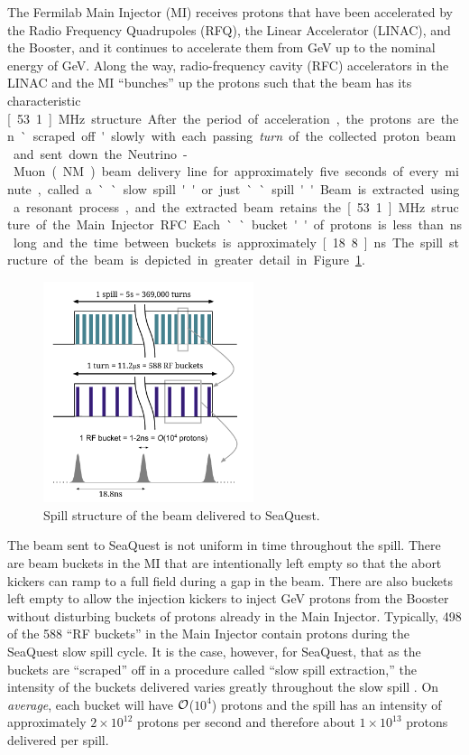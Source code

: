 The Fermilab Main Injector (MI) receives protons that have been accelerated by the Radio Frequency Quadrupoles (RFQ), the Linear Accelerator (LINAC), and the Booster, and it continues to accelerate them from \unit[8]{GeV} up to the nominal energy of \unit[120]{GeV}. Along the way, radio-frequency cavity (RFC) accelerators in the LINAC and the MI ``bunches'' up the protons such that the beam has its characteristic \unit[53.1]{MHz} structure. After the period of acceleration, the protons are then `scraped off' slowly with each passing \emph{turn} of the collected proton beam and sent down the Neutrino-Muon (NM) beam delivery line for approximately five seconds of every minute, called a ``slow spill'' or just ``spill''. Beam is extracted using a resonant process, and the extracted beam retains the \unit[53.1]{MHz} structure of the Main Injector RFC. Each ``bucket'' of protons is less than \unit[2]{ns} long and the time between buckets is approximately \unit[18.8]{ns}. The spill structure of the beam is depicted in greater detail in Figure \ref{fig:SpillStructure}.

\begin{figure}
	\begin{center}
		\includegraphics[width=0.55\textwidth]{figures/apparatus/SpillStructure.pdf}
		\caption{Spill structure of the beam delivered to SeaQuest.}
		\label{fig:SpillStructure}
	\end{center}
\end{figure}

The beam sent to SeaQuest is not uniform in time throughout the spill.  There are beam buckets in the MI that are intentionally left empty so that the abort kickers can ramp to a full field during a gap in the beam. There are also buckets left empty to allow the injection kickers to inject \unit[8]{GeV} protons from the Booster without disturbing buckets of protons already in the Main Injector.  Typically, 498 of the 588 ``RF buckets'' in the Main Injector contain protons during the SeaQuest slow spill cycle.  It is the case, however, for SeaQuest, that as the buckets are ``scraped'' off in a procedure called ``slow spill extraction,'' the intensity of the buckets delivered varies greatly throughout the slow spill . On \emph{average}, each bucket will have \emph{$\mathcal{O}$}($10^4$) protons and the spill has an intensity of approximately $2\times 10^{12}$ protons per second and therefore about $1\times 10^{13}$ protons delivered per spill.

